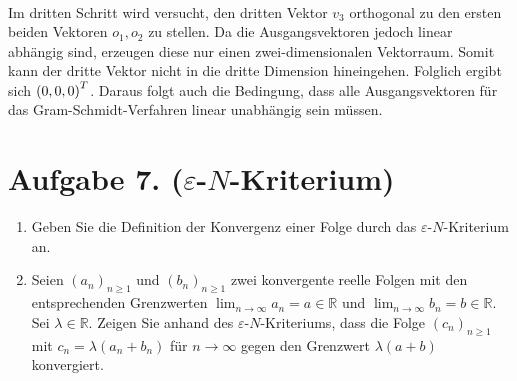 \documentclass[german,12pt]{homework}
\DeclarePairedDelimiter{\enbrace}{(}{)}
\begin{document}
\begin{align*}
    \end{align*}
    Im dritten Schritt wird versucht, den dritten Vektor \(v_3\) orthogonal zu den ersten beiden Vektoren \(o_1, o_2\) zu stellen. Da die Ausgangsvektoren jedoch linear abhängig sind, erzeugen diese nur einen zwei-dimensionalen Vektorraum. Somit kann der dritte Vektor nicht in die dritte Dimension hineingehen. Folglich ergibt sich \(\enbrace*{0, 0, 0}^T\). Daraus folgt auch die Bedingung, dass alle Ausgangsvektoren für das Gram-Schmidt-Verfahren linear unabhängig sein müssen.

    \section*{Aufgabe 7. (\(\varepsilon\)-\(N\)-Kriterium)}

    \begin{problem}
        \begin{enumerate}
            \item Geben Sie die Definition der Konvergenz einer Folge durch das \(\varepsilon\)-\(N\)-Kriterium an.
            \item Seien \(\left(a_n\right)_{n \ge 1}\) und \(\left(b_n\right)_{n \ge 1}\) zwei konvergente reelle Folgen mit den entsprechenden Grenzwerten \(\lim_{n \to \infty}a_n = a \in \mathbb{R}\) und \(\lim_{n \to \infty}b_n = b \in \mathbb{R}\). Sei \(\lambda \in \mathbb{R}\). Zeigen Sie anhand des \(\varepsilon\)-\(N\)-Kriteriums, dass die Folge \(\left(c_n\right)_{n \ge 1}\) mit \(c_n = \lambda\left(a_n + b_n\right)\) für \(n \to \infty\) gegen den Grenzwert \(\lambda\left(a + b\right)\) konvergiert.
        \end{enumerate}
    \end{problem}
\end{document}
